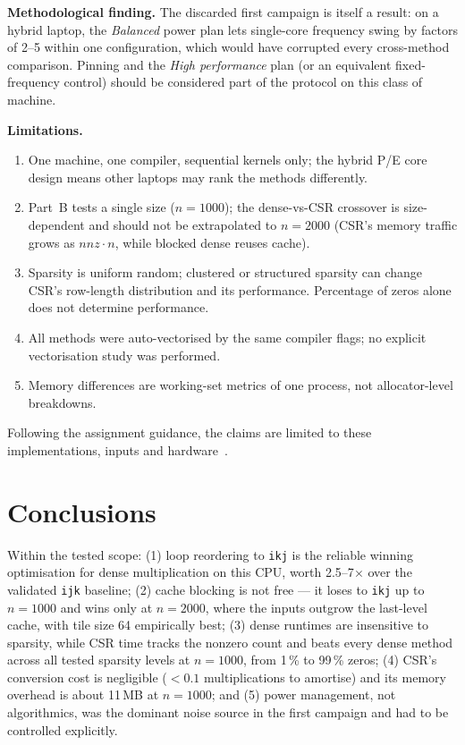 \documentclass[11pt,a4paper]{article}
\begin{document}
\textbf{Methodological finding.} The discarded first campaign is itself a result:
on a hybrid laptop, the \emph{Balanced} power plan lets single-core frequency
swing by factors of 2--5 within one configuration, which would have corrupted
every cross-method comparison. Pinning and the \emph{High performance} plan (or
an equivalent fixed-frequency control) should be considered part of the
protocol on this class of machine.

\textbf{Limitations.}
\begin{enumerate}
  \item One machine, one compiler, sequential kernels only; the hybrid
        P/E core design means other laptops may rank the methods differently.
  \item Part~B tests a single size ($n=1000$); the dense-vs-CSR crossover is
        size-dependent and should not be extrapolated to $n=2000$ (CSR's memory
        traffic grows as $nnz \cdot n$, while blocked dense reuses cache).
  \item Sparsity is uniform random; clustered or structured sparsity can change
        CSR's row-length distribution and its performance. Percentage of zeros
        alone does not determine performance.
  \item All methods were auto-vectorised by the same compiler flags; no
        explicit vectorisation study was performed.
  \item Memory differences are working-set metrics of one process, not
        allocator-level breakdowns.
\end{enumerate}

Following the assignment guidance, the claims are limited to these
implementations, inputs and hardware~\cite{fleming1986,mytkowicz2009}.

\section{Conclusions}

Within the tested scope: (1) loop reordering to \texttt{ikj} is the reliable
winning optimisation for dense multiplication on this CPU, worth 2.5--7$\times$
over the validated \texttt{ijk} baseline; (2) cache blocking is not free --- it
loses to \texttt{ikj} up to $n=1000$ and wins only at $n=2000$, where the inputs
outgrow the last-level cache, with tile size 64 empirically best; (3) dense
runtimes are insensitive to sparsity, while CSR time tracks the nonzero count and
beats every dense method across all tested sparsity levels at $n=1000$, from
1\,\% to 99\,\% zeros; (4) CSR's conversion cost is negligible
($<0.1$ multiplications to amortise) and its memory overhead is about 11\,MB at
$n=1000$; and (5) power management, not algorithmics, was the dominant noise
source in the first campaign and had to be controlled explicitly.
\end{document}
